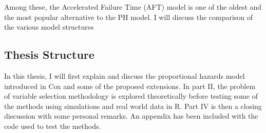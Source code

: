 Among these, the Accelerated Failure Time (AFT) model is one of the oldest and the most popular alternative to the PH model. I will discuss the comparison of the various model structures %

\subsection{Thesis Structure}

In this thesis, I will first explain and discuss the proportional hazards model introduced in Cox  and some of the proposed extensions. In part II, the problem of variable selection methodology is explored theoretically before testing some of the methods using simulations and real world data in R. Part IV is then a closing discussion with some personal remarks. An appendix has been included with the code used to test the methods.